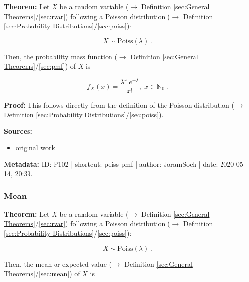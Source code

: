 \documentclass[a4paper,12pt,twoside]{book}
\begin{document}
\textbf{Theorem:} Let $X$ be a random variable ($\rightarrow$ Definition \ref{sec:General Theorems}/\ref{sec:rvar}) following a Poisson distribution ($\rightarrow$ Definition \ref{sec:Probability Distributions}/\ref{sec:poiss}):

\begin{equation} \label{eq:poiss-pmf-Poiss}
X \sim \mathrm{Poiss}(\lambda) \; .
\end{equation}

Then, the probability mass function ($\rightarrow$ Definition \ref{sec:General Theorems}/\ref{sec:pmf}) of $X$ is

\begin{equation} \label{eq:poiss-pmf-Poiss-pmf}
f_X(x) = \frac{\lambda^x \, e^{-\lambda}}{x!}, \; x \in \mathbb{N}_0 \; .
\end{equation}


\vspace{1em}
\textbf{Proof:} This follows directly from the definition of the Poisson distribution ($\rightarrow$ Definition \ref{sec:Probability Distributions}/\ref{sec:poiss}).


\vspace{1em}
\textbf{Sources:}
\begin{itemize}
\item original work\end{itemize}


\vspace{1em}
\textbf{Metadata:} ID: P102 | shortcut: poiss-pmf | author: JoramSoch | date: 2020-05-14, 20:39.
\vspace{1em}



\subsubsection[\textbf{Mean}]{Mean} \label{sec:poiss-mean}
\setcounter{equation}{0}

\textbf{Theorem:} Let $X$ be a random variable ($\rightarrow$ Definition \ref{sec:General Theorems}/\ref{sec:rvar}) following a Poisson distribution ($\rightarrow$ Definition \ref{sec:Probability Distributions}/\ref{sec:poiss}):

\begin{equation} \label{eq:poiss-mean-poiss}
X \sim \mathrm{Poiss}(\lambda) \; .
\end{equation}

Then, the mean or expected value ($\rightarrow$ Definition \ref{sec:General Theorems}/\ref{sec:mean}) of $X$ is
\end{document}
